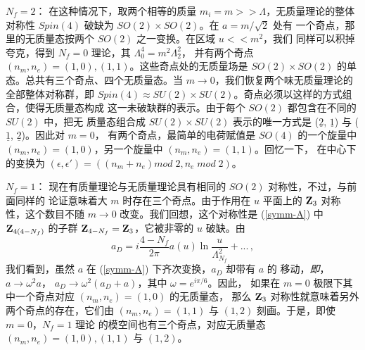 \noindent\underline{$N_f = 2$}：
在这种情况下，取两个相等的质量 $m_i=m >>\Lambda$，无质量理论的整体
对称性 $Spin(4)$ 破缺为 $SO(2) \times SO(2)$。在 $a = m/ \sqrt{2}$ 处有
一个奇点，那里的无质量态按两个 $SO(2)$ 之一变换。在区域 $u<<m^2$，我们
同样可以积掉夸克，得到 $N_f=0$ 理论，其 $\Lambda^4_0=m^2\Lambda^2_2$，
并有两个奇点 $(n_m, n_e) = (1,0), (1,1)$。这些奇点处的无质量场是
$SO(2)\times SO(2)$ 的单态。总共有三个奇点、四个无质量态。当
$m \rightarrow 0$，我们恢复两个味无质量理论的全部整体对称群，即 $Spin (4)
\approx SU(2) \times SU(2)$。奇点必须以这样的方式组合，使得无质量态构成
这一未破缺群的表示。由于每个 $SO(2)$ 都包含在不同的 $SU(2)$ 中，把无
质量态组合成 $SU(2)\times SU(2)$ 表示的唯一方式是 ($\underline{2}$,
$\underline{1}$) 与 ($\underline{1}$, $\underline{2}$)。因此对 $m = 0$，
有两个奇点，最简单的电荷赋值是 $SO(4)$ 的一个旋量中
$(n_m , n_e ) = (1,0)$，另一个旋量中 $(n_m , n_e ) = (1,1)$。回忆一下，
在中心下的变换为 $(\epsilon,\epsilon')=((n_m+n_e) mod\; 2, n_e\; mod\;2)$。


\noindent\underline{$N_f=1$}：
现在有质量理论与无质量理论具有相同的 $SO(2)$ 对称性，不过，与前面同样的
论证意味着大 $m$ 时存在三个奇点。由于作用在 $u$ 平面上的 ${\bf Z}_3$
对称性，这个数目不随 $m\rightarrow 0$ 改变。我们回想，这个对称性是
(\ref{symm-A}) 中 ${\bf Z}_{4(4-N_f)}$ 的子群
${\bf Z}_{4-N_f}={\bf Z}_{3}$，它被非零的 $u$ 破缺。由
$$
a_D = i \frac{4-N_f}{2\pi} a(u) \ln \frac{u}{\Lambda^2_{N_f}}+...\,,
$$
我们看到，虽然 $a$ 在 (\ref{symm-A}) 下齐次变换，$a_D$ 却带有 $a$ 的
移动，{\it 即}，$a\rightarrow \omega^2 a$，
$a_D \rightarrow \omega^2 (a_D + a)$，其中 $\omega = e^{i\pi/6}$。因此，
如果在 $m=0$ 极限下其中一个奇点对应 $(n_m , n_e ) = (1,0)$ 的无质量态，
那么 ${\bf Z}_3$ 对称性就意味着另外两个奇点的存在，它们由
$(n_m , n_e )= (1,1)$ 与 $(1,2)$ 刻画。于是，即使 $m=0$，$N_f=1$ 理论
的模空间也有三个奇点，对应无质量态 $(n_m , n_e )= (1,0), (1,1)$ 与
$(1,2)$。


